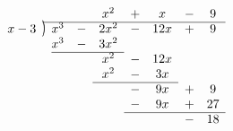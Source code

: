 \documentclass[preview]{standalone}
\newcommand{\longdiv}{\smash{\mkern-0.43mu\vstretch{1.31}{\hstretch{.7}{)}}\mkern-5.2mu\vstretch{1.31}{\hstretch{.7}{)}}}}
\begin{document}
\begin{equation*}
    \begin{array}{*1r @{\hskip\arraycolsep}c@{\hskip\arraycolsep} *{7}c}
      &          &     &   & x^2  & + & x   & - & 9 \\
        \cline{2-9}
x - 3 & \longdiv & x^3 & - & 2x^2 & - & 12x & + & 9\\
      &          & x^3 & - & 3x^2 &   &     &   & \\
        \cline{3-5}
      &          &     &   & x^2  & - & 12x &   & \\
      &          &     &   & x^2  & - & 3x  &   & \\
        \cline{5-7}
      &          &     &   &      & - & 9x  & + & 9 \\
      &          &     &   &      & - & 9x  & + & 27 \\
        \cline{6-9}
      &          &     &   &      &   &     & - & 18 \\
\end{array}
\end{equation*}
\end{document}

